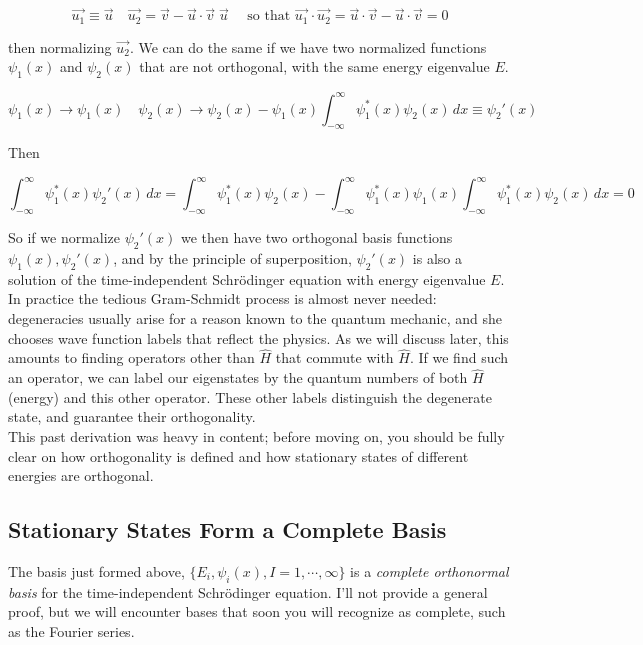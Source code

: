 \[
\vec{u_1} \equiv \vec{u} \quad \vec{u_2} = \vec{v} - \vec{u} \cdot
\vec{v} \; \vec{u} \quad \text{ so that } \vec{u_1} \cdot \vec{u_2} = \vec{u} \cdot
\vec{v} - \vec{u} \cdot \vec{v} = 0
\] \vspace{3px}

then normalizing $\vec{u_2}$. We can do the same if we have two normalized
functions $\psi_1(x)$ and $\psi_2(x)$ that are not orthogonal, with the same
energy eigenvalue $E$. 

\[
\psi_1(x) \rightarrow \psi_1(x) \quad \psi_2(x) \rightarrow \psi_2(x)
- \psi_1(x) \int_{-\infty}^{\infty} \psi_1^*(x) \psi_2(x) \, dx \equiv
\psi_2'(x)
\] \vspace{3px}

Then

\[
\int_{-\infty}^{\infty} \psi_1^*(x) \psi_2'(x) \, dx = \int_{-\infty}^{\infty}
\psi_1^*(x) \psi_2(x) - \int_{-\infty}^{\infty} \psi_1^*(x) \psi_1(x)
\int_{-\infty}^{\infty} \psi_1^*(x) \psi_2(x) \, dx = 0
\] \vspace{3px}

So if we normalize $\psi_2'(x)$ we then have two orthogonal basis functions
$\psi_1(x), \psi_2'(x)$, and by the principle of superposition, $\psi_2'(x)$ is
also a solution of the time-independent Schr\"odinger equation with energy
eigenvalue $E$. \\

In practice the tedious Gram-Schmidt process is almost never needed: degeneracies usually arise
for a reason known to the quantum mechanic, and she chooses wave function labels that reflect the
physics. As we will discuss later, this amounts to finding operators other than
$\hat{H}$ that commute
with $\hat{H}$. If we find such an operator, we can label our eigenstates by the quantum numbers of
both $\hat{H}$ (energy) and this other operator. These other labels distinguish the degenerate state, and
guarantee their orthogonality.\\

This past derivation was heavy in content; before moving on, you should be fully clear on how
orthogonality is defined and how stationary states of different energies are
orthogonal. 

\subsection{Stationary States Form a Complete Basis}

The basis just formed above, $\{E_i, \psi_i(x), I = 1, \cdots , \infty\}$ is
a \textit{complete orthonormal basis} for the time-independent Schr\"odinger
equation. I'll not provide a general proof, but we will encounter bases that
soon you will recognize as complete, such as the Fourier series. \\

